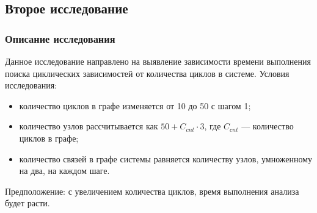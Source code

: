 \subsection{Второе исследование}
\subsubsection{Описание исследования}
Данное исследование направлено на выявление зависимости времени выполнения поиска
циклических зависимостей от количества циклов в системе. Условия исследования:
\begin{itemize}
    \item количество циклов в графе изменяется от 10 до 50 с шагом 1;
    \item количество узлов рассчитывается как \( 50 + C_{cnt} \cdot 3 \), где \( C_{cnt} \) --- количество циклов в графе;
    \item количество связей в графе системы равняется количеству узлов, умноженному на два, на каждом шаге.
\end{itemize}

Предположение: с увеличением количества циклов, время выполнения анализа будет расти.

